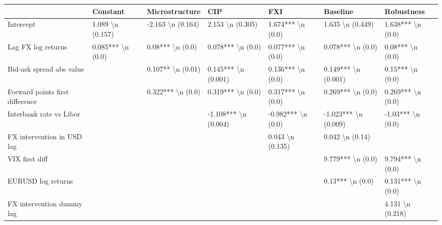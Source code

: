\begin{tabular}{lllllll}
\toprule
{} &             Constant &       Microstructure &                   CIP &                  FXI &              Baseline &           Robustness \\
\midrule
Intercept                                  &     1.089 \textbackslash n (0.157) &    -2.163 \textbackslash n (0.164) &      2.153 \textbackslash n (0.305) &    1.674*** \textbackslash n (0.0) &      1.635 \textbackslash n (0.449) &    1.638*** \textbackslash n (0.0) \\
Lag FX log returns                         &    0.085*** \textbackslash n (0.0) &     0.08*** \textbackslash n (0.0) &     0.078*** \textbackslash n (0.0) &    0.077*** \textbackslash n (0.0) &     0.078*** \textbackslash n (0.0) &     0.08*** \textbackslash n (0.0) \\
Bid-ask spread abs value                   &                      &    0.107** \textbackslash n (0.01) &   0.145*** \textbackslash n (0.001) &    0.136*** \textbackslash n (0.0) &   0.149*** \textbackslash n (0.001) &     0.15*** \textbackslash n (0.0) \\
Forward points first difference            &                      &    0.322*** \textbackslash n (0.0) &     0.319*** \textbackslash n (0.0) &    0.317*** \textbackslash n (0.0) &     0.269*** \textbackslash n (0.0) &    0.269*** \textbackslash n (0.0) \\
Interbank rate vs Libor                    &                      &                      &  -1.108*** \textbackslash n (0.004) &   -0.982*** \textbackslash n (0.0) &  -1.023*** \textbackslash n (0.009) &    -1.03*** \textbackslash n (0.0) \\
FX intervention in USD lag                 &                      &                      &                       &     0.043 \textbackslash n (0.135) &       0.042 \textbackslash n (0.14) &                      \\
VIX first diff                             &                      &                      &                       &                      &     9.779*** \textbackslash n (0.0) &    9.794*** \textbackslash n (0.0) \\
EURUSD log returns                         &                      &                      &                       &                      &      0.13*** \textbackslash n (0.0) &    0.131*** \textbackslash n (0.0) \\
FX intervention dummy lag                  &                      &                      &                       &                      &                       &     4.131 \textbackslash n (0.218) \\

\end{tabular}
